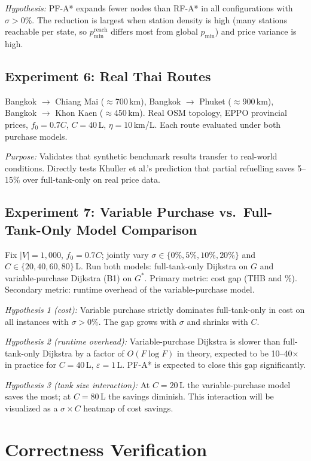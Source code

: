 \textit{Hypothesis:} PF-A* expands fewer nodes than RF-A* in all configurations with
$\sigma > 0\%$.
The reduction is largest when station density is high (many stations reachable per state, so
$p_{\min}^{\mathrm{reach}}$ differs most from global $p_{\min}$) and price variance is high.

\subsection{Experiment 6: Real Thai Routes}

Bangkok $\to$ Chiang Mai ($\approx$700\,km), Bangkok $\to$ Phuket ($\approx$900\,km),
Bangkok $\to$ Khon Kaen ($\approx$450\,km).
Real OSM topology, EPPO provincial prices, $f_0=0.7C$, $C=40$\,L, $\eta=10$\,km/L.
Each route evaluated under both purchase models.

\textit{Purpose:} Validates that synthetic benchmark results transfer to real-world conditions.
Directly tests Khuller et al.'s prediction that partial refuelling saves 5--15\% over
full-tank-only on real price data.

\subsection{Experiment 7: Variable Purchase vs.\ Full-Tank-Only Model Comparison}

Fix $|V|=1{,}000$, $f_0=0.7C$; jointly vary $\sigma \in \{0\%,5\%,10\%,20\%\}$ and
$C \in \{20,40,60,80\}$\,L.
Run both models: full-tank-only Dijkstra on $G$ and variable-purchase Dijkstra (B1) on
$G^{*}$.
Primary metric: cost gap (THB and \%).
Secondary metric: runtime overhead of the variable-purchase model.

\textit{Hypothesis 1 (cost):} Variable purchase strictly dominates full-tank-only in cost on
all instances with $\sigma > 0\%$.
The gap grows with $\sigma$ and shrinks with $C$.

\textit{Hypothesis 2 (runtime overhead):} Variable-purchase Dijkstra is slower than
full-tank-only Dijkstra by a factor of $O(F\log F)$ in theory, expected to be 10--40$\times$
in practice for $C=40$\,L, $\varepsilon=1$\,L.
PF-A* is expected to close this gap significantly.

\textit{Hypothesis 3 (tank size interaction):} At $C=20$\,L the variable-purchase model
saves the most; at $C=80$\,L the savings diminish.
This interaction will be visualized as a $\sigma \times C$ heatmap of cost savings.

\section{Correctness Verification}

